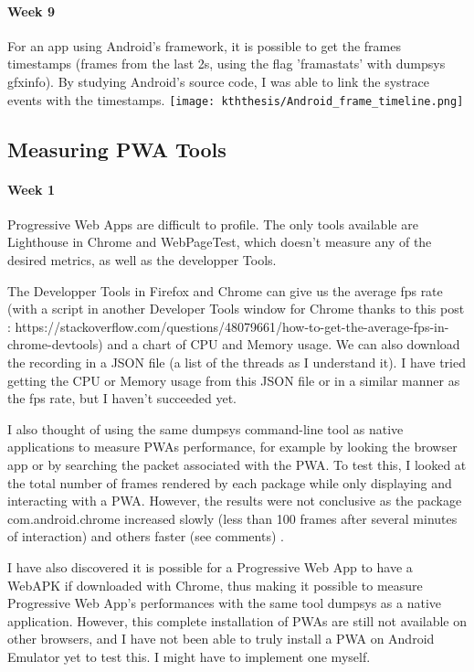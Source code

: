 \documentclass{kththesis}
\begin{document}
\paragraph{Week 9}
For an app using Android's framework, it is possible to get the frames timestamps (frames from the last 2s, using the flag 'framastats' with dumpsys gfxinfo). By studying Android's source code, I was able to link the systrace events with the timestamps.
\newline
\texttt{[image: kththesis/Android\_frame\_timeline.png]}
            
\subsection{Measuring PWA Tools}
\paragraph{Week 1}
Progressive Web Apps are difficult to profile. The only tools available are Lighthouse in Chrome and WebPageTest, which doesn't measure any of the desired metrics, as well as the developper Tools.

The Developper Tools in Firefox and Chrome can give us the average fps rate (with a script in another Developer Tools window for Chrome thanks to this post : https://stackoverflow.com/questions/48079661/how-to-get-the-average-fps-in-chrome-devtools) and a chart of CPU and Memory usage. We can also download the recording in a JSON file (a list of the threads as I understand it). I have tried getting the CPU or Memory usage from this JSON file or in a similar manner as the fps rate, but I haven't succeeded yet. 

I also thought of using the same dumpsys command-line tool as native applications to measure PWAs performance, for example by looking the browser app or by searching the packet associated with the PWA. To test this,  I looked at the total number of frames rendered by each package while only displaying and interacting with a PWA. However, the results were not conclusive as the package com.android.chrome increased slowly (less than 100 frames after several minutes of interaction) and others faster (see comments) %
. 

I have also discovered it is possible for a Progressive Web App to have a WebAPK if downloaded with Chrome, thus making it possible to measure Progressive Web App's performances with the same tool dumpsys as a native application. However, this complete installation of PWAs are still not available on other browsers, and I have not been able to truly install a PWA on Android Emulator yet to test this. I might have to implement one myself. 
\end{document}
